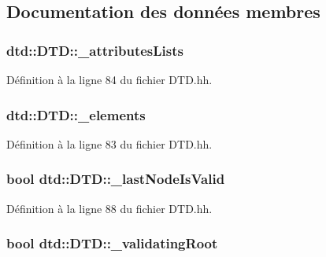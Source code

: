 \subsection{Documentation des données membres}
\hypertarget{classdtd_1_1_d_t_d_aec11a99c5e351b44bbdef249500bb1ac}{
\subsubsection[{\_\-attributesLists}]{ {\bf dtd::DTD::\_\-attributesLists}}}
\label{classdtd_1_1_d_t_d_aec11a99c5e351b44bbdef249500bb1ac}


Définition à la ligne 84 du fichier DTD.hh.

\hypertarget{classdtd_1_1_d_t_d_ab28c987860b12e12e5b9e3c199b4a4fd}{
\subsubsection[{\_\-elements}]{ {\bf dtd::DTD::\_\-elements}}}
\label{classdtd_1_1_d_t_d_ab28c987860b12e12e5b9e3c199b4a4fd}


Définition à la ligne 83 du fichier DTD.hh.

\hypertarget{classdtd_1_1_d_t_d_a1d27a4c5f57f3eac45bba4207fb0fa2e}{
\subsubsection[{\_\-lastNodeIsValid}]{\setlength{\rightskip}{0pt plus 5cm}bool {\bf dtd::DTD::\_\-lastNodeIsValid}}}
\label{classdtd_1_1_d_t_d_a1d27a4c5f57f3eac45bba4207fb0fa2e}


Définition à la ligne 88 du fichier DTD.hh.

\hypertarget{classdtd_1_1_d_t_d_acd1f91b37ce5dd73597f880c08546d40}{
\subsubsection[{\_\-validatingRoot}]{\setlength{\rightskip}{0pt plus 5cm}bool {\bf dtd::DTD::\_\-validatingRoot}}}
\label{classdtd_1_1_d_t_d_acd1f91b37ce5dd73597f880c08546d40}


